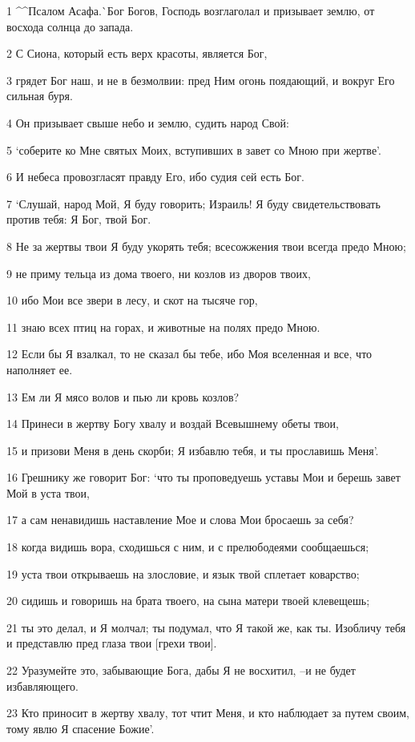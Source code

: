 \par 1 ^^Псалом Асафа.^^ Бог Богов, Господь возглаголал и призывает землю, от восхода солнца до запада.
\par 2 С Сиона, который есть верх красоты, является Бог,
\par 3 грядет Бог наш, и не в безмолвии: пред Ним огонь поядающий, и вокруг Его сильная буря.
\par 4 Он призывает свыше небо и землю, судить народ Свой:
\par 5 `соберите ко Мне святых Моих, вступивших в завет со Мною при жертве'.
\par 6 И небеса провозгласят правду Его, ибо судия сей есть Бог.
\par 7 `Слушай, народ Мой, Я буду говорить; Израиль! Я буду свидетельствовать против тебя: Я Бог, твой Бог.
\par 8 Не за жертвы твои Я буду укорять тебя; всесожжения твои всегда предо Мною;
\par 9 не приму тельца из дома твоего, ни козлов из дворов твоих,
\par 10 ибо Мои все звери в лесу, и скот на тысяче гор,
\par 11 знаю всех птиц на горах, и животные на полях предо Мною.
\par 12 Если бы Я взалкал, то не сказал бы тебе, ибо Моя вселенная и все, что наполняет ее.
\par 13 Ем ли Я мясо волов и пью ли кровь козлов?
\par 14 Принеси в жертву Богу хвалу и воздай Всевышнему обеты твои,
\par 15 и призови Меня в день скорби; Я избавлю тебя, и ты прославишь Меня'.
\par 16 Грешнику же говорит Бог: `что ты проповедуешь уставы Мои и берешь завет Мой в уста твои,
\par 17 а сам ненавидишь наставление Мое и слова Мои бросаешь за себя?
\par 18 когда видишь вора, сходишься с ним, и с прелюбодеями сообщаешься;
\par 19 уста твои открываешь на злословие, и язык твой сплетает коварство;
\par 20 сидишь и говоришь на брата твоего, на сына матери твоей клевещешь;
\par 21 ты это делал, и Я молчал; ты подумал, что Я такой же, как ты. Изобличу тебя и представлю пред глаза твои [грехи твои].
\par 22 Уразумейте это, забывающие Бога, дабы Я не восхитил, --и не будет избавляющего.
\par 23 Кто приносит в жертву хвалу, тот чтит Меня, и кто наблюдает за путем своим, тому явлю Я спасение Божие'.

